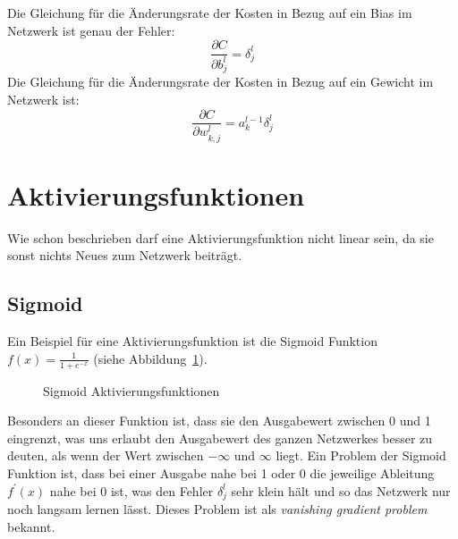 \documentclass[12pt,a4paper]{report}
\begin{document}
Die Gleichung für die Änderungsrate der Kosten in Bezug auf ein Bias im Netzwerk ist genau der Fehler:
\[\frac{\partial C}{\partial b^l_j} = \delta^l_j\]
Die Gleichung für die Änderungsrate der Kosten in Bezug auf ein Gewicht im Netzwerk ist:
\[\frac{\partial C}{\partial w^{l}_{k,j}} = a^{l-1}_k\delta^l_j\]

\section{Aktivierungsfunktionen}\label{sec:aktivierungsfunktionen}
Wie schon beschrieben darf eine Aktivierungsfunktion nicht linear sein, da sie sonst nichts Neues zum Netzwerk beiträgt.
\subsection{Sigmoid}
Ein Beispiel für eine Aktivierungsfunktion ist die Sigmoid Funktion $f(x) = \frac{1}{1 + e^{-x}}$ (siehe Abbildung~\ref{fig:activation1}).
\begin{figure}[!h]
    \centering
{}
    \caption{Sigmoid Aktivierungsfunktionen}
    \label{fig:activation1}
\end{figure}
Besonders an dieser Funktion ist, dass sie den Ausgabewert zwischen 0 und 1 eingrenzt, was uns erlaubt den Ausgabewert des ganzen
Netzwerkes besser zu deuten, als wenn der Wert zwischen $-\infty$ und $\infty$ liegt.
Ein Problem der Sigmoid Funktion ist, dass bei einer Ausgabe nahe bei 1 oder 0 die jeweilige Ableitung $f^\prime(x)$ nahe bei 0 ist,
was den Fehler $\delta^l_j$ sehr klein hält und so das Netzwerk nur noch langsam lernen lässt.
Dieses Problem ist als \textit{vanishing gradient problem} bekannt.
\end{document}
